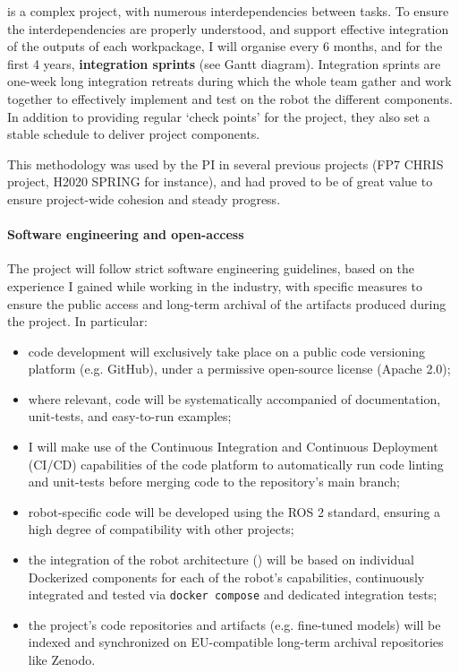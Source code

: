 \project is a complex project, with numerous interdependencies between tasks.
To ensure the interdependencies are properly understood, and support effective
integration of the outputs of each workpackage, I will organise every 6 months,
and for the first 4 years, \textbf{integration sprints} (see Gantt diagram).
Integration sprints are one-week long integration retreats during which the whole
\project team gather and work together to effectively implement and test on the
robot the different components. In addition to providing regular `check points'
for the project, they also set a stable schedule to deliver project components.

This methodology was used by the PI in  several previous projects (FP7 CHRIS
project, H2020 SPRING for instance), and had proved to be of great value to
ensure project-wide cohesion and steady progress.

\paragraph{Software engineering and open-access}

The project will follow strict software engineering guidelines, based on the
experience I gained while working in the industry, with specific measures to
ensure the public access and long-term archival of the artifacts produced during
the project. In particular:

\begin{itemize}
    \item code development will exclusively take place on a public code versioning
        platform (e.g. GitHub), under a permissive open-source license (Apache
        2.0);
    \item where relevant, code will be systematically accompanied of
        documentation, unit-tests, and easy-to-run examples;
    \item I will make use of the Continuous Integration and Continuous
        Deployment (CI/CD) capabilities of the code platform to automatically
        run code linting and unit-tests before merging code to the repository's
        main branch;
    \item robot-specific code will be developed using the ROS 2 standard,
        ensuring a high degree of compatibility with other projects;
    \item the integration of the robot architecture (\tCC) will be based on individual Dockerized
        components for each of the robot's capabilities, continuously integrated
        and tested via \texttt{docker compose} and dedicated integration tests;
    \item the project's code repositories and artifacts (e.g. fine-tuned models)
        will be indexed and synchronized on EU-compatible long-term archival
        repositories like Zenodo.  
\end{itemize}

